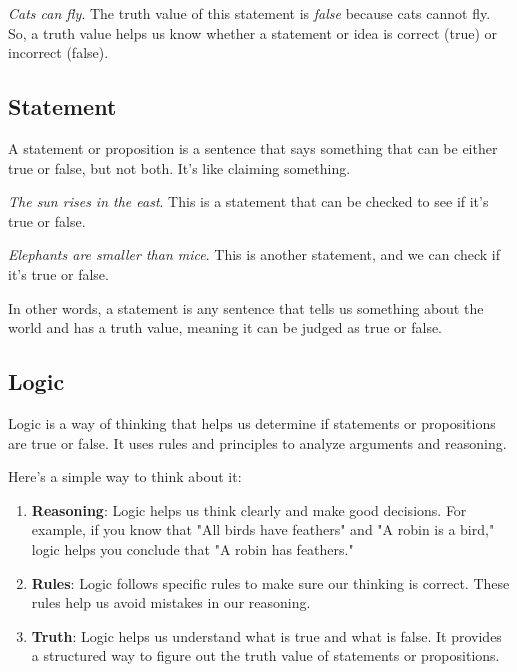 \documentclass{article}
\theoremstyle{mytheoremstyle}
\theoremstyle{mytheoremstyle}
\theoremstyle{myexamplestyle}
\begin{document}
\begin{example}
    \emph{Cats can fly}. The truth value of this statement is \emph{false} because cats cannot fly. So, a truth value helps us know whether a statement or idea is correct (true) or incorrect (false).
\end{example}


\subsection{Statement}

\begin{definition}
    A statement or proposition is a sentence that says something
    that can be either true or false, but not both. It's like
    claiming something.
\end{definition}

\begin{example}
    \emph{The sun rises in the east}. This is a statement that can be checked to see if it's true or false.
\end{example}

\begin{example}
    \emph{Elephants are smaller than mice}. This is another statement, and we can check if it's true or false.
\end{example}

In other words, a statement is any sentence that tells us something about the world and has a truth value, meaning it can be judged as true or false.


\newpage

\subsection{Logic}

\begin{definition}
    Logic is a way of thinking that helps us determine if statements or propositions are true or false. It uses rules and principles to analyze arguments and reasoning.
\end{definition}

Here's a simple way to think about it:

\begin{enumerate}
    \item \textbf{Reasoning}: Logic helps us think clearly and make good decisions. For example, if you know that "All birds have feathers" and "A robin is a bird," logic helps you conclude that "A robin has feathers."

    \item \textbf{Rules}: Logic follows specific rules to make sure our thinking is correct. These rules help us avoid mistakes in our reasoning.

    \item \textbf{Truth}: Logic helps us understand what is true and what is false. It provides a structured way to figure out the truth value of statements or propositions.
\end{enumerate}
\end{document}
